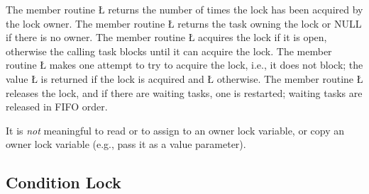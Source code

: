 \documentclass[openright,twoside]{report}
\begin{document}
The member routine \LGinlinetrue\LGbegin\lgrinde\L{}\endlgrinde\LGend{} returns the number of times the lock has been acquired by the lock owner.
The member routine \LGinlinetrue\LGbegin\lgrinde\L{}\endlgrinde\LGend{} returns the task owning the lock or NULL if there is no owner.
The member routine \LGinlinetrue\LGbegin\lgrinde\L{}\endlgrinde\LGend{} acquires the lock if it is open, otherwise the calling task blocks until it can acquire the lock.
The member routine \LGinlinetrue\LGbegin\lgrinde\L{}\endlgrinde\LGend{} makes one attempt to try to acquire the lock, i.e., it does not block;
the value \LGinlinetrue\LGbegin\lgrinde\L{}\endlgrinde\LGend{} is returned if the lock is acquired and \LGinlinetrue\LGbegin\lgrinde\L{}\endlgrinde\LGend{} otherwise.
The member routine \LGinlinetrue\LGbegin\lgrinde\L{}\endlgrinde\LGend{} releases the lock, and if there are waiting tasks, one is restarted;
waiting tasks are released in FIFO order.

It is \emph{not} meaningful to read or to assign to an owner lock variable, or copy an owner lock variable (e.g., pass it as a value parameter).


\subsection{Condition Lock}
\label{s:ConditionLock}
\end{document}
